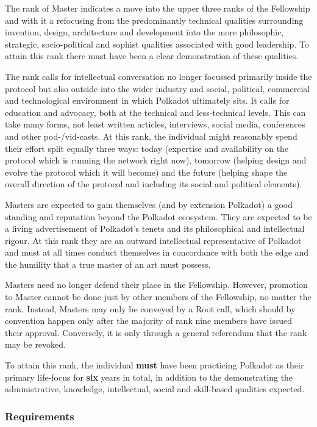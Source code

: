 \documentclass[9pt,oneside]{amsart}
\begin{document}
The rank of Master indicates a move into the upper three ranks of the Fellowship and with it a refocusing from the predominantly technical qualities surrounding invention, design, architecture and development into the more philosophic, strategic, socio-political and sophist qualities associated with good leadership. To attain this rank there must have been a clear demonstration of these qualities.

The rank calls for intellectual conversation no longer focussed primarily inside the protocol but also outside into the wider industry and social, political, commercial and technological environment in which Polkadot ultimately sits. It calls for education and advocacy, both at the technical and less-technical levels. This can take many forms, not least written articles, interviews, social media, conferences and other pod-/vid-casts. At this rank, the individual might reasonably spend their effort split equally three ways: today (expertise and availability on the protocol which is running the network right now), tomorrow (helping design and evolve the protocol which it will become) and the future (helping shape the overall direction of the protocol and including its social and political elements).

Masters are expected to gain themselves (and by extension Polkadot) a good standing and reputation beyond the Polkadot ecosystem. They are expected to be a living advertisement of Polkadot's tenets and its philosophical and intellectual rigour. At this rank they are an outward intellectual representative of Polkadot and must at all times conduct themselves in concordance with both the edge and the humility that a true master of an art must possess.

Masters need no longer defend their place in the Fellowship. However, promotion to Master cannot be done just by other members of the Fellowship, no matter the rank. Instead, Masters may only be conveyed by a Root call, which should by convention happen only after the majority of rank nine members have issued their approval. Conversely, it is only through a general referendum that the rank may be revoked.

To attain this rank, the individual \textbf{must} have been practicing Polkadot as their primary life-focus for \textbf{six} years in total, in addition to the demonstrating the administrative, knowledge, intellectual, social and skill-based qualities expected.

\subsubsection{Requirements}\label{requirements-6}
\end{document}
